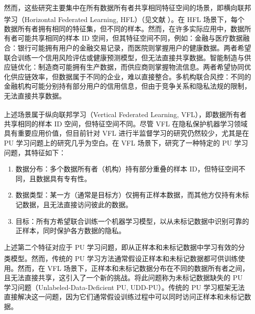 然而，这些研究主要集中在所有数据所有者共享相同特征空间的场景，即横向联邦学习（Horizontal Federated Learning, HFL）（见文献 \textsuperscript{\cite{yang2019federated}}）。在 HFL 场景下，每个数据所有者拥有相同的特征集，但不同的样本。然而，在许多实际应用中，数据所有者可能共享相同的样本 ID 空间，但其特征空间不同，例如：金融与医疗数据融合：银行可能拥有用户的金融交易记录，而医院则掌握用户的健康数据。两者希望联合训练一个信用风险评估或健康预测模型，但无法直接共享数据。智能制造与供应链优化：制造商可能拥有生产数据，而供应商则掌握物流信息。两者希望协同优化供应链效率，但数据属于不同的企业，难以直接整合。多机构联合风控：不同的金融机构可能分别持有部分用户的信用信息，但由于竞争关系和隐私法规的限制，无法直接共享数据。

上述场景属于纵向联邦学习（Vertical Federated Learning, VFL）\textsuperscript{\cite{yang2019federated}}，即数据所有者共享相同的样本 ID 空间，但特征空间不同。尽管 VFL 在隐私保护机器学习领域具有重要应用价值，但目前针对 VFL 进行半监督学习的研究仍然较少，尤其是在 PU 学习问题上的研究几乎为空白。在 VFL 场景下，研究了一种特定的 PU 学习问题，其特征如下：
\begin{enumerate}
	\item 数据分布：多个数据所有者（机构）持有部分重叠的样本 ID，但特征空间不同，且数据具有专有性。
	\item 数据类型：某一方（通常是目标方）仅拥有正样本数据，而其他方仅持有未标记数据，且无法直接访问彼此的数据。
	\item 目标：所有方希望联合训练一个机器学习模型，以从未标记数据中识别可靠的正样本，同时保护各方数据的隐私。
\end{enumerate}

上述第二个特征对应于 PU 学习问题，即从正样本和未标记数据中学习有效的分类模型。然而，传统的 PU 学习方法\textsuperscript{\cite{mordelet2014bagging, liu2003building, liu2015classification, xu2017multi}}通常假设正样本和未标记数据都可供训练使用。然而，在 VFL 场景下，正样本和未标记数据分布在不同的数据所有者之间，且无法直接共享，这引入了一个新的挑战。将此问题称为未标记数据缺失的 PU 学习问题（Unlabeled-Data-Deficient PU, UDD-PU）。传统的 PU 学习框架无法直接解决这一问题，因为它们通常假设训练过程中可以同时访问正样本和未标记数据。

